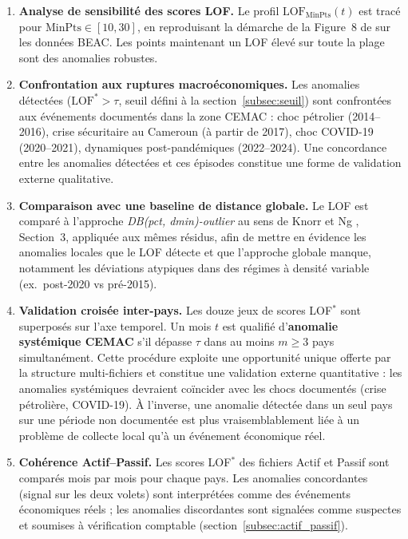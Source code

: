 \documentclass[12pt, a4paper]{article}
\begin{document}
\begin{enumerate}
    \item \textbf{Analyse de sensibilité des scores LOF.}
    Le profil $\text{LOF}_{\text{MinPts}}(t)$ est tracé pour
    $\text{MinPts} \in [10, 30]$, en reproduisant la démarche de la
    Figure~8 de \cite{breunig2000lof} sur les données BEAC. Les points
    maintenant un LOF élevé sur toute la plage sont des anomalies robustes.

    \item \textbf{Confrontation aux ruptures macroéconomiques.}
    Les anomalies détectées ($\text{LOF}^* > \tau$, seuil défini à la
    section~\ref{subsec:seuil}) sont confrontées aux événements documentés
    dans la zone CEMAC : choc pétrolier (2014--2016), crise sécuritaire au
    Cameroun (à partir de 2017), choc COVID-19 (2020--2021), dynamiques
    post-pandémiques (2022--2024). Une concordance entre les anomalies
    détectées et ces épisodes constitue une forme de validation externe
    qualitative.

    \item \textbf{Comparaison avec une baseline de distance globale.}
    Le LOF est comparé à l'approche \textit{DB(pct, dmin)-outlier}
    au sens de Knorr et Ng \cite{breunig2000lof}, Section~3, appliquée aux
    mêmes résidus, afin de mettre en évidence les anomalies locales que le
    LOF détecte et que l'approche globale manque, notamment les déviations
    atypiques dans des régimes à densité variable
    (ex.\ post-2020 vs pré-2015).

    \item \textbf{Validation croisée inter-pays.}
    Les douze jeux de scores LOF$^*$ sont superposés sur l'axe temporel.
    Un mois $t$ est qualifié d'\textbf{anomalie systémique CEMAC} s'il
    dépasse $\tau$ dans au moins $m \geq 3$ pays simultanément. Cette
    procédure exploite une opportunité unique offerte par la structure
    multi-fichiers et constitue une validation externe quantitative : les
    anomalies systémiques devraient coïncider avec les chocs documentés
    (crise pétrolière, COVID-19). À l'inverse, une anomalie détectée dans
    un seul pays sur une période non documentée est plus vraisemblablement
    liée à un problème de collecte local qu'à un événement économique réel.

    \item \textbf{Cohérence Actif--Passif.}
    Les scores LOF$^*$ des fichiers Actif et Passif sont comparés mois par
    mois pour chaque pays. Les anomalies concordantes (signal sur les deux
    volets) sont interprétées comme des événements économiques réels ; les
    anomalies discordantes sont signalées comme suspectes et soumises à
    vérification comptable (section~\ref{subsec:actif_passif}).
\end{enumerate}
\end{document}
